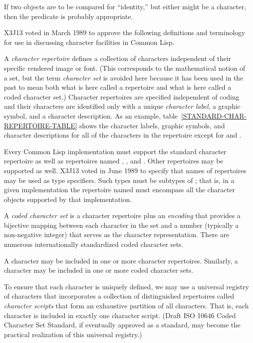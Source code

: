 If two objects are to be compared for ``identity,'' but either might be
a character, then the predicate  is probably appropriate.

\begin{newer}
X3J13 voted in March 1989 
to approve the following definitions and terminology for use in
discussing character facilities in Common Lisp.

A \emph{character repertoire} defines a collection of characters
independent of their specific rendered image or font.  (This corresponds
to the mathematical notion of a set, but the term \emph{character set}
is avoided here because it has been used in the past to mean
both what is here called a repertoire and what is here called a coded
character set.)
Character repertoires are specified independent of coding and their characters
are identified only with a unique \emph{character label},
a graphic symbol, and a character description.
As an example, table~\ref{STANDARD-CHAR-REPERTOIRE-TABLE}
shows the character labels, graphic symbols, and character descriptions for
all of the characters in the repertoire 
except for  and .

Every Common Lisp implementation must support the standard character repertoire
as well as repertoires named , ,
and .  Other repertoires may be supported as well.
X3J13 voted in June 1989  to specify that names of
repertoires may be used as type specifiers.  Such types must be subtypes of ;
that is, in a given implementation
the repertoire named  must encompass all the character objects supported
by that implementation.

A \emph{coded character set} is a character repertoire plus an \emph{encoding}
that provides a bijective mapping between each character in the set and a number
(typically a non-negative integer)
that serves as the character representation.
There are numerous internationally standardized coded character sets.

A character may be included in one or more character repertoires.
Similarly, a character may be included in one or more coded character sets.

To ensure that each character is uniquely defined, we may use a universal registry of
characters that incorporates a collection of distinguished repertoires
called \emph{character scripts} that form an exhaustive partition of all characters.
That is, each character is included in exactly one character script.
(Draft ISO 10646 Coded Character Set Standard, if eventually approved as a standard,
may become the practical realization of this universal registry.)


\end{newer}
